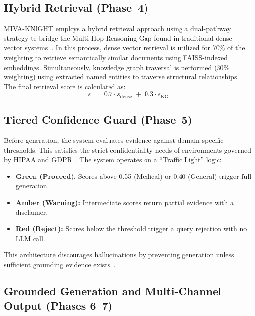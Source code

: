 \documentclass[12pt, a4paper]{article}
\begin{document}
\subsection{Hybrid Retrieval (Phase~4)}

MIVA-KNIGHT employs a hybrid retrieval approach using a dual-pathway strategy
to bridge the Multi-Hop Reasoning Gap found in traditional dense-vector
systems~\cite{sarmah2024hybridrag,lewis2020rag}. In this process, dense vector
retrieval is utilized for 70\% of the weighting to retrieve semantically similar
documents using FAISS-indexed embeddings. Simultaneously, knowledge graph
traversal is performed (30\% weighting) using extracted named entities to
traverse structural relationships. The final retrieval score is calculated as:
\begin{equation}
  s \;=\; 0.7 \cdot s_{\mathrm{dense}} \;+\; 0.3 \cdot s_{\mathrm{KG}}
\end{equation}

\subsection{Tiered Confidence Guard (Phase~5)}

Before generation, the system evaluates evidence against domain-specific
thresholds. This satisfies the strict confidentiality needs of environments
governed by HIPAA and GDPR~\cite{tang2024multihop}. The system operates on a
``Traffic Light'' logic:

\begin{itemize}[leftmargin=1.5em]
  \item \textbf{Green (Proceed):} Scores above 0.55 (Medical) or 0.40
    (General) trigger full generation.
  \item \textbf{Amber (Warning):} Intermediate scores return partial evidence
    with a disclaimer.
  \item \textbf{Red (Reject):} Scores below the threshold trigger a query
    rejection with no LLM call.
\end{itemize}

This architecture discourages hallucinations by preventing generation unless
sufficient grounding evidence exists~\cite{sarmah2024hybridrag}.

\subsection{Grounded Generation and Multi-Channel Output (Phases 6--7)}
\end{document}
